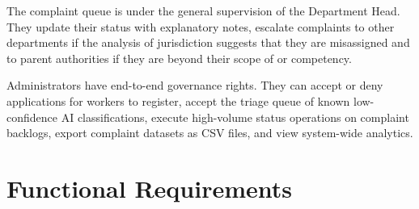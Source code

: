 The complaint queue is under the general supervision of the Department Head. They update their status with explanatory notes, escalate complaints to other departments if the analysis of jurisdiction suggests that they are misassigned and to parent authorities if they are beyond their scope of or competency.

Administrators have end-to-end governance rights. They can accept or deny applications for workers to register, accept the triage queue of known low-confidence AI classifications, execute high-volume status operations on complaint backlogs, export complaint datasets as CSV files, and view system-wide analytics.

\section{Functional Requirements}

